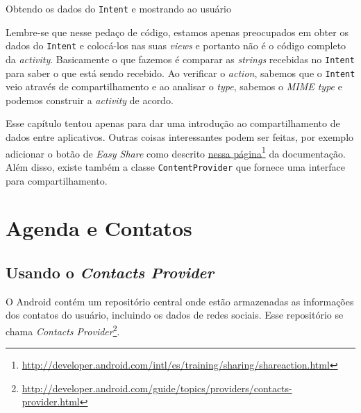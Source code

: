 \documentclass[a4paper,12pt,brazil]{book}
\begin{document}
\begin{singlespace}
		\begin{listing}[H]
		\inputminted[linenos=true,fontsize=\small,frame=lines, framesep=2mm, tabsize=2,numbersep=5pt]{java}{src/api/sharing/receive.java}
		\caption{Obtendo os dados do \texttt{Intent} e mostrando ao usuário}
		\label{code:sharingintent}
		\end{listing} 		

		Lembre-se que nesse pedaço de código, estamos apenas preocupados em obter os dados do \texttt{Intent} e colocá-los nas suas \emph{views} e portanto não é o código completo da \emph{activity}. Basicamente o que fazemos é comparar as \emph{strings} recebidas no \texttt{Intent} para saber o que está sendo recebido. Ao verificar o \emph{action}, sabemos que o \texttt{Intent} veio através de compartilhamento e ao analisar o \emph{type}, sabemos o \emph{MIME type} e podemos construir a \emph{activity} de acordo.


		Esse capítulo tentou apenas para dar uma introdução ao compartilhamento de dados entre aplicativos. Outras coisas interessantes podem ser feitas, por exemplo adicionar o botão de \emph{Easy Share} como descrito \href{http://developer.android.com/intl/es/training/sharing/shareaction.html}{nessa página}\footnote{\href{http://developer.android.com/intl/es/training/sharing/shareaction.html}{http://developer.android.com/intl/es/training/sharing/shareaction.html}} da documentação. Além disso, existe também a classe \texttt{ContentProvider} que fornece uma interface para compartilhamento.
		
		
\chapter{Agenda e Contatos} 
	\section{Usando o \emph{Contacts Provider}}

	O Android contém um repositório central onde estão armazenadas as informações dos contatos do usuário, incluindo os dados de redes sociais. Esse repositório se chama \emph{Contacts Provider}\footnote{\href{http://developer.android.com/guide/topics/providers/contacts-provider.html}{http://developer.android.com/guide/topics/providers/contacts-provider.html}}.	
	

\end{singlespace}
\end{document}
